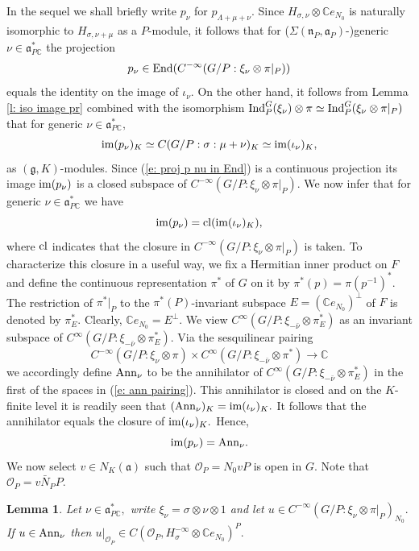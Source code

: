 \documentclass[12pt,a4paper]{article}
\newtheorem{Lemma}[Thm]{Lemma}
\newenvironment{lemma}[0]{\begin{Lemma}\noindent}%
{\end{Lemma}}
\def\msy#1{{\mathbb #1}}
\def\C{{\msy C}}
\def\gs{\sigma}
\def\gS{\Sigma}
\def\got#1{\mathfrak #1}
\def\fa{{\got a}}
\def\fg{{\got g}}
\def\fn{{\got n}}
\def\to{\rightarrow}
\def\End{{\rm End}}
\def\iC{{\scriptscriptstyle \C}}
\def\cO{{\mathcal O}}
\numberwithin{Thm}{section}
\numberwithin{equation}{section}
\def\Ind{{\rm Ind}}
\def\faPdc{{\fa_{P\iC}^*}}
\def\gL{\Lambda}
\numberwithin{equation}{section}
\def\cl{{\rm cl}}
\def\gL{\Lambda}
\def\faPdc{\fa_{P\iC}^*}
\begin{document}
In the sequel we shall briefly write $p_\nu$ for $p_{\gL + \mu +\nu}.$ 
Since $H_{\gs, \nu} \otimes \C e_{N_0}$ is naturally isomorphic to $ H_{\gs, \nu + \mu}$ as
a $P$-module, it follows that for ($\gS(\fn_P,\fa_P)$-)generic $\nu\in \faPdc$ the projection 
\begin{equation}
\label{e: proj p nu in End}
p_\nu \in \End(C^{-\infty}(G /P: \xi_\nu \otimes \pi|_P))
\end{equation}
equals the identity on the image of 
$\iota_\nu.$  On the other hand, it follows from Lemma \ref{l: iso image pr}
combined with the isomorphism 
$\Ind_P^G (\xi_\nu ) \otimes \pi \simeq \Ind_P^G (\xi_\nu  \otimes \pi|_P)$
that for generic $\nu \in \faPdc,$ 
$$ 
{\rm im}(p_{\nu})_K \simeq C(G/P: \gs: \mu + \nu)_K \simeq {\rm im}(\iota_\nu)_K,
$$
as $(\fg, K)$-modules. Since (\ref{e: proj p nu in End}) is a continuous projection 
 its image ${\rm im} (p_\nu)$ is a closed subspace of $C^{-\infty}(G /P: \xi_\nu \otimes \pi|_P).$
We now infer that for generic $\nu \in \faPdc$ we have
$$ 
{\rm im}(p_{\nu}) = \cl({\rm im}(\iota_\nu)_K),
$$ 
where ${\rm cl}$ indicates that the closure in $C^{-\infty}(G/P:\xi_\nu \otimes \pi|_P)$ is taken.
To characterize this closure in a useful way, we fix a Hermitian inner product on $F$
and define the continuous representation $\pi^*$ of $G$ on it by $\pi^*(p) = \pi(p^{-1})^{*}.$ 
The restriction of $\pi^*|_P$ to the $\pi^*(P)$-invariant subspace $E = (\C e_{N_0})^\perp$ of $F$ is denoted by $\pi^*_E.$ Clearly, $\C e_{N_0} = E^\perp.$ We view $C^\infty(G/P: \xi_{-\bar \nu} \otimes \pi^*_E)$ as an invariant subspace of $C^\infty(G/P: \xi_{-\bar \nu} \otimes \pi^*_E)$.
Via the sesquilinear pairing
\begin{equation}
\label{e: ann pairing}
C^{-\infty}(G/P: \xi_\nu \otimes  \pi) \times C^\infty(G/P: \xi_{-\bar \nu} \otimes \pi^*)\to \C
\end{equation}
we accordingly define ${\rm Ann}_\nu$ to be the annihilator of $C^\infty(G/P: \xi_{-\bar \nu} \otimes \pi^*_E)$
in the first of the spaces in (\ref{e: ann pairing}). This annihilator is closed and on the $K$-finite level it is readily seen that
$({\rm Ann}_\nu)_K = {\rm im} (\iota_\nu)_K.$ It follows that the annihilator equals the closure of
${\rm im} (\iota_\nu)_K.$ Hence,
$$ 
 {\rm im}(p_{\nu}) = {\rm Ann}_\nu .
 $$ 
 We now select $v \in N_K(\fa)$ such that $\cO_P = N_0 v P$ is open in $G.$ 
Note that $\cO_P = v \bar N_P P.$ 
 \begin{lemma}
 \label{l: char annihilator on N zero}
 Let $\nu \in \faPdc,$ write $\xi_\nu = \gs \otimes \nu \otimes 1$ and let
 $ 
 u \in  C^{-\infty}(G/P:\xi_\nu \otimes \pi|_P)_{N_0}.
 $
 If $u \in {\rm Ann}_\nu $ then 
 $
 u|_{\cO_P} \in C(\cO_P, H_\gs^{-\infty} \otimes \C e_{N_0})^P.
 $
 \end{lemma}
 
\end{document}

